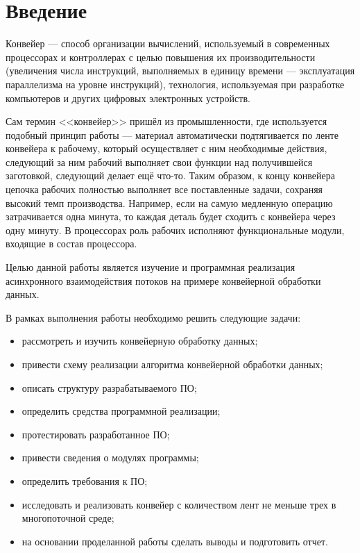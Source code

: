 \chapter*{Введение}

Конвейер — способ организации вычислений, используемый в современных процессорах и контроллерах с целью повышения их производительности (увеличения числа инструкций, выполняемых в единицу времени — эксплуатация параллелизма на уровне инструкций), технология, используемая при разработке компьютеров и других цифровых электронных устройств.

Сам термин <<конвейер>> пришёл из промышленности, где используется подобный принцип работы — материал автоматически подтягивается по ленте конвейера к рабочему, который осуществляет с ним необходимые действия, следующий за ним рабочий выполняет свои функции над получившейся заготовкой, следующий делает ещё что-то. Таким образом, к концу конвейера цепочка рабочих полностью выполняет все поставленные задачи, сохраняя высокий темп производства. Например, если на самую медленную операцию затрачивается одна минута, то каждая деталь будет сходить с конвейера через одну минуту. В процессорах роль рабочих исполняют функциональные модули, входящие в состав процессора.

Целью данной работы является изучение и программная реализация асинхронного взаимодействия потоков на примере конвейерной обработки данных.

В рамках выполнения работы необходимо решить следующие задачи:
\begin{itemize}
	\item рассмотреть и изучить конвейерную обработку данных;
	\item привести схему реализации алгоритма конвейерной обработки данных;
	\item описать структуру разрабатываемого ПО;
	\item определить средства программной реализации;
	\item протестировать разработанное ПО;
	\item привести сведения о модулях программы;
	\item определить требования к ПО;
	\item исследовать и реализовать конвейер с количеством лент не меньше трех в многопоточной среде;
	\item на основании проделанной работы сделать выводы и подготовить отчет.
\end{itemize}